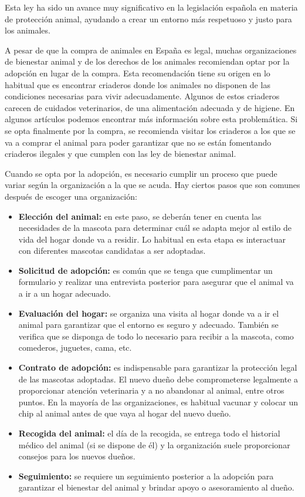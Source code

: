 \documentclass[a4paper, 12pt]{article}
\begin{document}
Esta ley ha sido un avance muy significativo en la legislación española en materia de protección animal, ayudando a crear un entorno más respetuoso y justo para los animales.

A pesar de que la compra de animales en España es legal, muchas organizaciones de bienestar animal y de los derechos de los animales recomiendan optar por la adopción en lugar de la compra. Esta recomendación tiene su origen en lo habitual que es encontrar criaderos donde los animales no disponen de las condiciones necesarias para vivir adecuadamente. Algunos de estos criaderos carecen de cuidados veterinarios, de una alimentación adecuada y de higiene. En algunos artículos \cite{petalatino} podemos encontrar más información sobre esta problemática. Si se opta finalmente por la compra, se recomienda visitar los criaderos a los que se va a comprar el animal para poder garantizar que no se están fomentando criaderos ilegales y que cumplen con las ley de bienestar animal.


Cuando se opta por la adopción, es necesario cumplir un proceso que puede variar según la organización a la que se acuda. Hay ciertos pasos que son comunes después de escoger una organización:

\begin{itemize}[noitemsep]
\item \textbf{Elección del animal:} en este paso, se deberán tener en cuenta las necesidades de la mascota para determinar cuál se adapta mejor al estilo de vida del hogar donde va a residir. Lo habitual en esta etapa es interactuar con diferentes mascotas candidatas a ser adoptadas.
\item \textbf{Solicitud de adopción:} es común que se tenga que cumplimentar un formulario y realizar una entrevista posterior para asegurar que el animal va a ir a un hogar adecuado.
\item \textbf{Evaluación del hogar:} se organiza una visita al hogar donde va a ir el animal para garantizar que el entorno es seguro y adecuado. También se verifica que se disponga de todo lo necesario para recibir a la mascota, como comederos, juguetes, cama, etc.
\item \textbf{Contrato de adopción:} es indispensable para garantizar la protección legal de las mascotas adoptadas. El nuevo dueño debe comprometerse legalmente a proporcionar atención veterinaria y a no abandonar al animal, entre otros puntos. En la mayoría de las organizaciones, es habitual vacunar y colocar un chip al animal antes de que vaya al hogar del nuevo dueño.
\item \textbf{Recogida del animal:} el día de la recogida, se entrega todo el historial médico del animal (si se dispone de él) y la organización suele proporcionar consejos para los nuevos dueños.
\item \textbf{Seguimiento:} se requiere un seguimiento posterior a la adopción para garantizar el bienestar del animal y brindar apoyo o asesoramiento al dueño.
\end{itemize}
\end{document}
